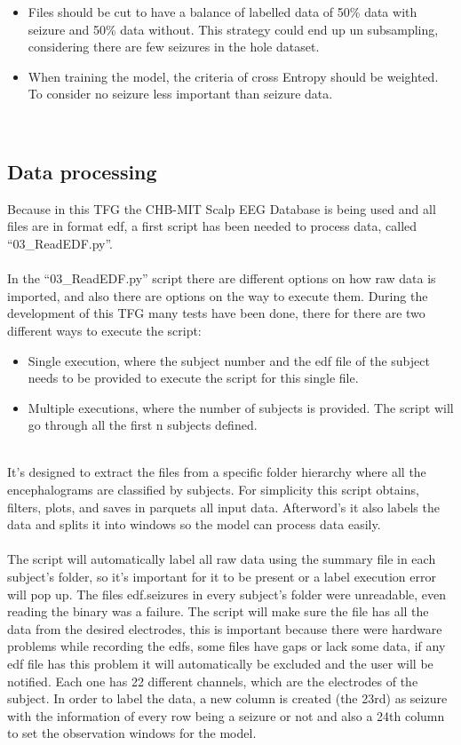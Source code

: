 \begin{itemize}
  \item Files should be cut to have a balance of labelled data of 50\% data with seizure and 50\% data without. This strategy could end up un subsampling, considering there are few seizures in the hole dataset.
  \item When training the model, the criteria of cross Entropy should be weighted. To consider no seizure less important than seizure data.
\end{itemize}
\leavevmode\\
\subsection{Data processing}
Because in this TFG the CHB-MIT Scalp EEG Database is being used and all files are in format edf, a first script has been needed to process data, called “03\_ReadEDF.py”.
\\\\
In the “03\_ReadEDF.py” script there are different options on how raw data is imported, and also there are options on the way to execute them. During the development of this TFG many tests have been done, there for there are two different ways to execute the script:
\\
\begin{itemize}
  \item Single execution, where the subject number and the edf file of the subject needs to be provided to execute the script for this single file. 
  \item Multiple executions, where the number of subjects is provided. The script will go through all the first n subjects defined.
\end{itemize}
\leavevmode\\
It’s designed to extract the files from a specific folder hierarchy where all the encephalograms are classified by subjects. For simplicity this script obtains, filters, plots, and saves in parquets all input data. Afterword’s it also labels the data and splits it into windows so the model can process data easily. 
\\\\
The script will automatically label all raw data using the summary file in each subject’s folder, so it’s important for it to be present or a label execution error will pop up. The files edf.seizures in every subject’s folder were unreadable, even reading the binary was a failure. The script will make sure the file has all the data from the desired electrodes, this is important because there were hardware problems while recording the edfs, some files have gaps or lack some data, if any edf file has this problem it will automatically be excluded and the user will be notified. Each one has 22 different channels, which are the electrodes of the subject. In order to label the data, a new column is created (the 23rd) as seizure with the information of every row being a seizure or not and also a 24th column to set the observation windows for the model.
